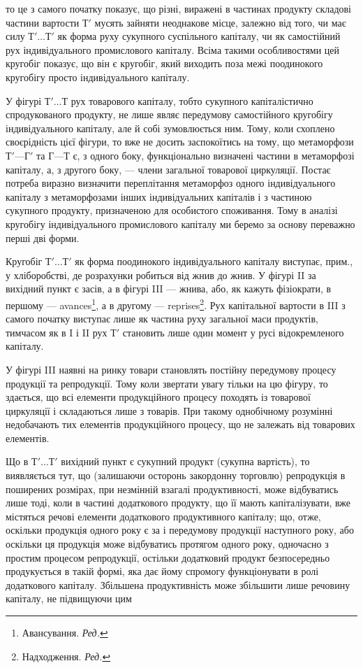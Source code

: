 \parcont{}  %
то це з самого початку показує, що різні, виражені в частинах продукту складові частини вартости $Т'$
мусять зайняти неоднакове місце, залежно від того, чи має силу $Т'\dots{} Т'$ як форма руху сукупного
суспільного капіталу, чи як самостійний рух індивідуального промислового капіталу. Всіма такими
особливостями цей кругобіг показує, що він є кругобіг, який виходить поза межі поодинокого кругобігу
просто індивідуального капіталу.

У фігурі $Т'\dots{} Т$ рух товарового капіталу, тобто сукупного капіталістично спродукованого продукту, не
лише являє передумову самостійного кругобігу індивідуального капіталу, але й собі зумовлюється ним.
Тому, коли схоплено своєрідність цієї фігури, то вже не досить заспокоїтись на тому, що метаморфози
$Т' — Г'$ та $Г — Т$ є, з одного боку, функціонально визначені частини в метаморфозі капіталу, а, з
другого боку, — члени загальної товарової циркуляції. Постає потреба виразно визначити переплітання
метаморфоз одного індивідуального капіталу з метаморфозами інших індивідуальних капіталів і з
частиною сукупного продукту, призначеною для особистого споживання. Тому в аналізі кругобігу
індивідуального промислового капіталу ми беремо за основу переважно перші дві форми.

Кругобіг $Т'\dots{} Т'$ як форма поодинокого індивідуального капіталу виступає, прим., у хліборобстві, де
розрахунки робиться від жнив до жнив. У фігурі II за вихідний пункт є засів, а в фігурі III — жнива,
або, як кажуть фізіократи, в першому — avances\footnote*{
Авансування. \emph{Ред.}
}, а в другому — reprises\footnote*{
Надходження. \emph{Ред.}
}. Рух капітальної
вартости в III з самого початку виступає лише як частина руху загальної маси продуктів, тимчасом як
в I і II рух $Т'$ становить лише один момент у русі відокремленого капіталу.

У фігурі III наявні на ринку товари становлять постійну передумову процесу продукції та репродукції.
Тому коли звертати увагу тільки на цю фігуру, то здається, що всі елементи продукційного процесу
походять із товарової циркуляції і складаються лише з товарів. При такому однобічному розумінні
недобачають тих елементів продукційного процесу, що не залежать від товарових елементів.

Що в $Т'\dots{} Т'$ вихідний пункт є сукупний продукт (сукупна вартість), то виявляється тут, що
(залишаючи осторонь закордонну торговлю) репродукція в поширених розмірах, при незмінній взагалі
продуктивності, може відбуватись лише тоді, коли в частині додаткового продукту, що її мають
капіталізувати, вже містяться речові елементи додаткового продуктивного капіталу; що, отже, оскільки
продукція одного року є за і передумову продукції наступного року, або оскільки ця продукція може
відбуватись протягом одного року, одночасно з простим процесом репродукції, остільки додатковий
продукт безпосередньо продукується в такій формі, яка дає йому спромогу функціонувати в ролі
додаткового капіталу. Збільшена продуктивність може збільшити лише речовину капіталу, не підвищуючи
цим
\parbreak{}  %
